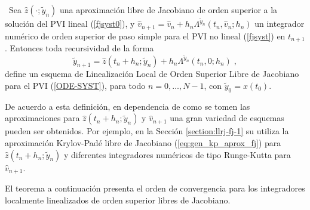 \begin{definition}\label{definition:holl-fj}
\cite{naranjo2023jacobian}~Sea $\hat{z}(\cdot;\widetilde{y}_n)$ una aproximación libre de Jacobiano de orden superior a la solución del PVI lineal (\ref{fjsyst0}), y $\widehat{v}_ {n+1}=\widehat{v}_n+h_n\Lambda^{\widetilde{y}_n}(t_n,\widehat{v}_n;h_n)$ un integrador numérico de orden superior de paso simple para el PVI no lineal (\ref{fjsyst}) en $t_{n+1}$. Entonces toda recursividad de la forma
\begin{equation*}
    \widetilde{y}_{n+1}= \hat{z}(t_n+h_n;\widetilde{y}_n)+h_n\Lambda^{\widetilde{y}_n}(t_n,0;h_n)\;,
\end{equation*}
define un esquema de Linealización Local de Orden Superior Libre de Jacobiano para el PVI (\ref{ODE-SYST}), para todo $n=0,\ldots,N-1$, con $\widetilde{y}_0=x(t_0)$.
\end{definition}

De acuerdo a esta definición, en dependencia de como se tomen las aproximaciones para $\hat{z}(t_n+h_n;\widetilde{y}_n)$ y $\widehat{v}_{n+1}$ una gran variedad de esquemas pueden ser obtenidos. Por ejemplo, en la Sección \ref{section:llrj-fj-1} su utiliza la aproximación Krylov-Padé libre de Jacobiano (\ref{eq:gen_kp_aprox_fj}) para $\hat{z}(t_n+h_n;\widetilde{y}_n)$ y diferentes integradores numéricos de tipo Runge-Kutta para $\widehat{v}_{n+1}$.

El teorema a continuación presenta el orden de convergencia para los integradores localmente linealizados de orden superior libres de Jacobiano.

